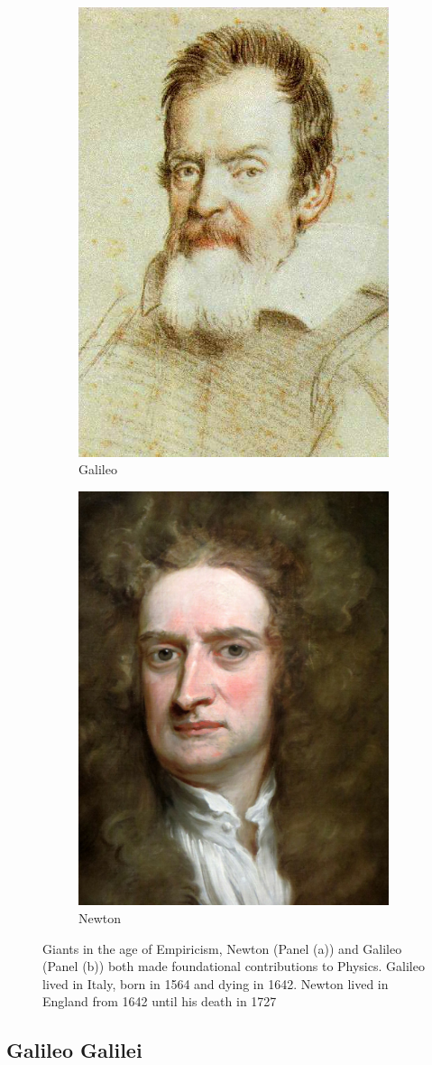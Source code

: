 \begin{figure}[ht]
	\centering
	\begin{subfigure}{.5\textwidth}
		\centering
		\includegraphics[width=0.4\linewidth]{./figures/galileo.jpg}
		\caption{Galileo \cite{Leoni1624}}
		\label{fig:galileo}
	\end{subfigure}%
	\begin{subfigure}{0.5\textwidth}
		\centering
		\includegraphics[width=0.4\linewidth]{./figures/newton.jpg}
		\caption{Newton}
		\label{fig:newton}
	\end{subfigure}
	\caption{ 
    Giants in the age of Empiricism, Newton (Panel (a)) and Galileo (Panel (b))
    both made foundational contributions to Physics.  Galileo lived in Italy,
    born in 1564 and dying in 1642. Newton lived in England from 1642 until his
    death in 1727
	}
	\label{fig:newtongalileo}
\end{figure}

\subsection{Galileo Galilei}

